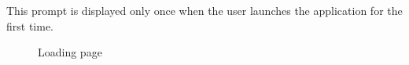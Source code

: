 This prompt is displayed only once when the user launches the application for the first time.
\begin{figure}[ht]
    \centering
    \hspace{2cm} %
    \caption{Loading page}
    \label{fig:loading-page}
\end{figure}
\pagebreak


